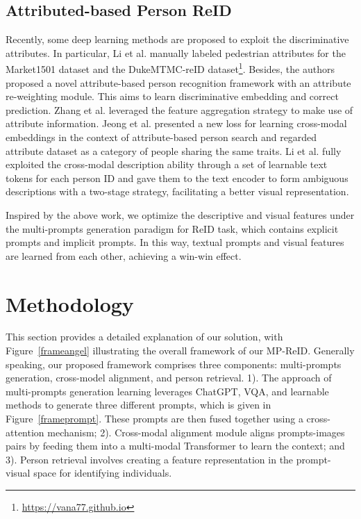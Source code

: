 \documentclass[letterpaper]{article} %
\begin{document}
\subsection{Attributed-based Person ReID}

Recently, some deep learning methods are proposed to exploit the discriminative attributes. In particular, Li et al. \cite{li2019attribute}  manually labeled pedestrian attributes for the Market1501 dataset and the DukeMTMC-reID dataset\footnote{\url{https://vana77.github.io}}. Besides, the authors proposed a novel attribute-based person recognition framework with an attribute re-weighting module. This aims to learn discriminative embedding and correct prediction. Zhang et al. \cite{zhang2020person} leveraged the feature aggregation strategy to make use of attribute information. Jeong et al. \cite{jeong2021asmr} presented a new loss for learning cross-modal embeddings in the context of attribute-based person search and regarded attribute dataset as a category of people sharing the same traits. Li et al. \cite{li2022clip} fully exploited the cross-modal description ability through a set of learnable text tokens for each person ID and gave them to the text encoder to form ambiguous descriptions with a two-stage strategy, facilitating a better visual representation.

Inspired by the above work, we optimize the descriptive and visual features under the multi-prompts generation paradigm for ReID task, which contains explicit prompts and implicit prompts. In this way, textual prompts and visual features are learned from each other, achieving a win-win effect.

\section{Methodology} \label{methodology}
This section provides a detailed explanation of our solution, with Figure~\ref{frameangel} illustrating the overall framework of our MP-ReID. Generally speaking, our proposed framework comprises three components: multi-prompts generation, cross-model alignment, and person retrieval. 
1). The approach of multi-prompts generation learning leverages ChatGPT, VQA, and learnable methods to generate three different prompts, which is given in Figure~\ref{frameprompt}. These prompts are then fused together using a cross-attention mechanism; 2). Cross-modal alignment module aligns prompts-images pairs by feeding them into a multi-modal Transformer to learn the context; and 3). Person retrieval involves creating a feature representation in the prompt-visual space for identifying individuals.
\end{document}
